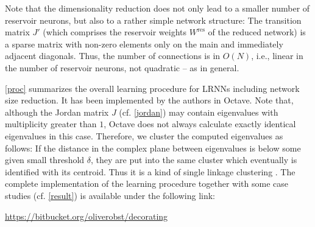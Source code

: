 \documentclass[twoside,11pt]{article}
\theoremstyle{definition}
\begin{document}
Note that the dimensionality reduction does not only lead to a smaller number of
reservoir neurons, but also to a rather simple network structure: The transition
matrix $J'$ (which comprises the reservoir weights $W^\mathrm{res}$ of
the reduced network) is a sparse matrix with non-zero elements only on the main
and immediately adjacent diagonals. Thus, the number of connections is in
$O(N)$, i.e., linear in the number of reservoir neurons, not quadratic -- as in
general.

\cref{proc} summarizes the overall learning procedure for LRNNs including
network size reduction. It has been implemented by the authors in Octave. Note
that, although the Jordan matrix $J$ (cf. \cref{jordan}) may
contain eigenvalues with multiplicity greater than $1$, Octave does not always
calculate exactly identical eigenvalues in this case. Therefore, we cluster the
computed eigenvalues as follows: If the distance in the complex plane between
eigenvalues is below some given small threshold $\delta$, they are put into the
same cluster which eventually is identified with its centroid. Thus it is a kind
of single linkage clustering \citep{GR69}. The complete implementation of the
learning procedure together with some case studies (cf. \cref{result}) is
available under the following link:
\begin{center}
	\url{https://bitbucket.org/oliverobst/decorating}
\end{center}
\end{document}
